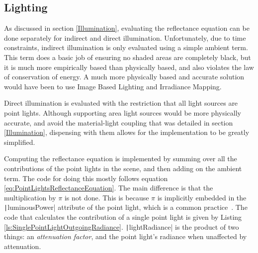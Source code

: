 
\subsection{Lighting} \label{PBRLighting}

As discussed in section \ref{Illumination}, evaluating the reflectance equation can be done separately for indirect and direct illumination. Unfortunately, due to time constraints, indirect illumination is only evaluated using a simple ambient term. This term does a basic job of ensuring no shaded areas are completely black, but it is much more empirically based than physically based, and also violates the law of conservation of energy. A much more physically based and accurate solution would have been to use Image Based Lighting and Irradiance Mapping.

Direct illumination is evaluated with the restriction that all light sources are point lights. Although supporting area light sources would be more physically accurate, and avoid the material-light coupling that was detailed in section \ref{Illumination}, dispensing with them allows for the implementation to be greatly simplified.

Computing the reflectance equation is implemented by summing over all the contributions of the point lights in the scene, and then adding on the ambient term. The code for doing this mostly follows equation \ref{eq:PointLightsReflectanceEquation}. The main difference is that the multiplication by \begin{math}\pi\end{math} is not done. This is because \begin{math}\pi\end{math} is implicitly embedded in the \texttt|luminousPower| attribute of the point light, which is a common practice~\cite{LagardePi}. The code that calculates the contribution of a single point light is given by Listing \ref{ls:SinglePointLightOutgoingRadiance}. \texttt|lightRadiance| is the product of two things: an \textit{attenuation factor}, and the point light's radiance when unaffected by attenuation.

